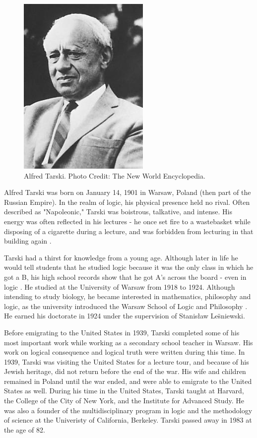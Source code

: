 \documentclass[../../../include/open-logic-section]{subfiles}
\begin{document}

\begin{figure}[h!] 
\centering
\includegraphics[scale=.75]{alfred-tarski.jpg} 
\caption{Alfred Tarski. Photo Credit: The New World Encyclopedia.}
 \end{figure}

Alfred Tarski was born on January 14, 1901 in Warsaw, Poland (then part of
the Russian Empire). In the realm of logic, his physical presence held no rival. 
Often
described as "Napoleonic," Tarski was boistrous, talkative, and intense.
His energy was often reflected in his lectures - he once set fire to a
wastebasket while disposing of a cigarette during a lecture, and was
forbidden from lecturing in that building again \citep[2]{feferman2004}.

Tarski had a thirst for knowledge from a young age. Although later in life
he would tell students that he studied logic because it was the only class
in which he got a B, his high school records show that he got A's across
the board - even in logic \citep[18]{feferman2004}. He studied at the
University of Warsaw from 1918 to 1924. Although intending to study
biology, he became interested in mathematics, philosophy and logic, as the
university introduced the Warsaw School of Logic and Philosophy
\cite[30]{feferman2004}. He earned his doctorate in 1924 under the
supervision of Stanisław Le\"{s}niewski.

Before emigrating to the United States in 1939, Tarski completed some of
his most important work while working as a secondary school teacher in
Warsaw. His work on logical consequence and logical truth were written
during this time. In 1939, Tarski was visiting the United States for a
lecture tour, and because of his Jewish heritage, did not return before the
end of the war. His wife and children remained in Poland until the war
ended, and were able to emigrate to the United States as well. During his
time in the United States, Tarski taught at Harvard, the College of the
City of New York, and the Institute for Advanced Study. He was also a
founder of the multidisciplinary program in logic and the methodology of
science at the Univeristy of California, Berkeley. Tarski passed away in
1983 at the age of 82.
\end{document}
